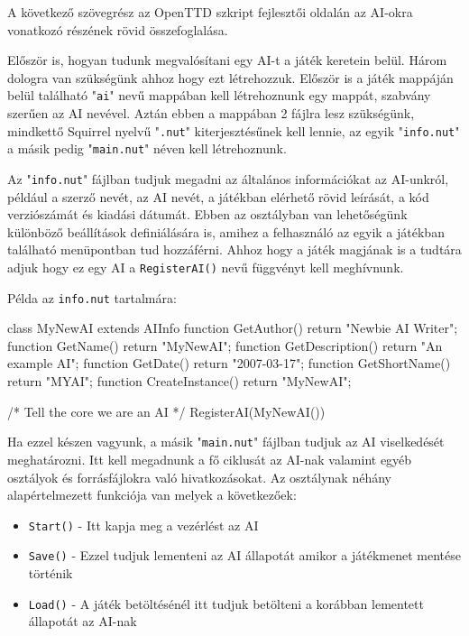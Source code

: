 
A következő szövegrész az OpenTTD szkript fejlesztői oldalán az AI-okra vonatkozó részének rövid összefoglalása\cite{noaidev}.

Először is, hogyan tudunk megvalósítani egy AI-t a játék keretein belül. Három dologra van szükségünk ahhoz hogy ezt létrehozzuk. Először is a játék mappáján belül található "\texttt{ai}" nevű mappában kell létrehoznunk egy mappát, szabvány szerűen az AI nevével. Aztán ebben a mappában 2 fájlra lesz szükségünk, mindkettő Squirrel nyelvű "\texttt{.nut}" kiterjesztésűnek kell lennie, az egyik "\texttt{info.nut}" a másik pedig "\texttt{main.nut}" néven kell létrehoznunk.

Az "\texttt{info.nut}" fájlban tudjuk megadni az általános információkat az AI-unkról, például a szerző nevét, az AI nevét, a játékban elérhető rövid leírását, a kód verziószámát és kiadási dátumát. Ebben az osztályban van lehetőségünk különböző beállítások definiálására is, amihez a felhasználó az egyik a játékban található menüpontban tud hozzáférni. Ahhoz hogy a játék magjának is a tudtára adjuk hogy ez egy AI a \texttt{RegisterAI()} nevű függvényt kell meghívnunk.

Példa az \texttt{info.nut} tartalmára:

\begin{cpp}
class MyNewAI extends AIInfo 
{
  function GetAuthor()        { return "Newbie AI Writer"; }
  function GetName()          { return "MyNewAI"; }
  function GetDescription()   { return "An example AI"; }
  function GetDate()          { return "2007-03-17"; }
  function GetShortName()     { return "MYAI"; }
  function CreateInstance()   { return "MyNewAI"; }
}

/* Tell the core we are an AI */
RegisterAI(MyNewAI())
\end{cpp}

Ha ezzel készen vagyunk, a másik "\texttt{main.nut}" fájlban tudjuk az AI viselkedését meghatározni. Itt kell megadnunk a fő ciklusát az AI-nak valamint egyéb osztályok és forrásfájlokra való hivatkozásokat. Az osztálynak néhány alapértelmezett funkciója van melyek a következőek:

\begin{itemize}
	\item \texttt{Start()} - Itt kapja meg a vezérlést az AI
	\item \texttt{Save()} - Ezzel tudjuk lementeni az AI állapotát amikor a játékmenet mentése történik
	\item \texttt{Load()} - A játék betöltésénél itt tudjuk betölteni a korábban lementett állapotát az AI-nak
\end{itemize}

